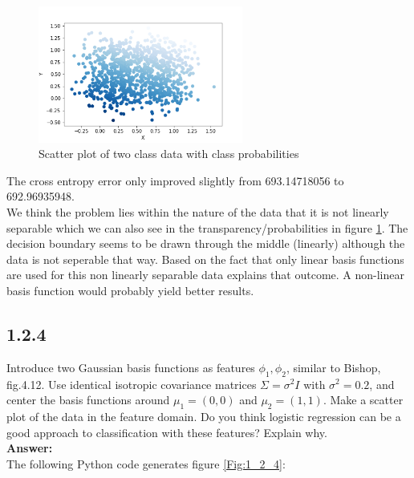 \documentclass[a4paper]{article}
\begin{document}
\begin{figure}[H]
\center
\includegraphics[width=0.6\textwidth]{Images/figure_1_2_3.png}
\caption{Scatter plot of two class data with class probabilities}
\label{Fig:1_2_3}
\end{figure}

The cross entropy error only improved slightly from 693.14718056 to 692.96935948.\\

We think the problem lies within the nature of the data that it is not linearly separable which we can also see in the transparency/probabilities in figure \ref{Fig:1_2_3}. The decision boundary seems to be drawn through the middle (linearly) although the data is not seperable that way. Based on the fact that only linear basis functions are used for this non linearly separable data explains that outcome. A non-linear basis function would probably yield better results.



\subsection*{1.2.4}

Introduce two Gaussian basis functions as features $\phi_1, \phi_2$, similar to Bishop, fig.4.12. Use identical isotropic covariance matrices $\Sigma = \sigma^2 I$ with $\sigma^2 = 0.2$, and center the basis functions around $\mu_1 = (0,0)$ and $\mu_2 = (1,1)$. Make a scatter plot of the data in the feature domain. Do you think logistic regression can be a good approach to classification with these features? Explain why.\\

\textbf{Answer:}\\

The following Python code generates figure \ref{Fig:1_2_4}:
\end{document}
